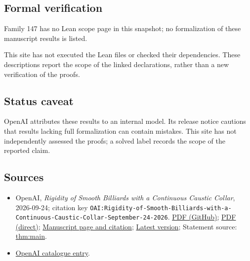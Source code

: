 \documentclass[11pt]{article}
\begin{document}
\subsection{Formal verification}
Family 147 has no Lean scope page in this snapshot; no formalization of these manuscript results is listed.

This site has not executed the Lean files or checked their dependencies. These descriptions report the scope of the linked declarations, rather than a new verification of the proofs.

\subsection{Status caveat}
OpenAI attributes these results to an internal model. Its release notice cautions that results lacking full formalization can contain mistakes. This site has not independently assessed the proofs; a solved label records the scope of the reported claim.

\subsection{Sources}
\begin{itemize}
\item OpenAI, \emph{Rigidity of Smooth Billiards with a Continuous Caustic Collar}, 2026-09-24; citation key \texttt{OAI:Rigidity-of-Smooth-Billiards-with-a-Continuous-Caustic-Collar-September-24-2026}. \href{https://github.com/openai/math/blob/adc7f1241b42e322a6451854ab7e4b4c146bf78a/preprints/Rigidity-of-Smooth-Billiards-with-a-Continuous-Caustic-Collar-September-24-2026/paper.pdf}{PDF (GitHub)}; \href{https://github.com/openai/math/raw/adc7f1241b42e322a6451854ab7e4b4c146bf78a/preprints/Rigidity-of-Smooth-Billiards-with-a-Continuous-Caustic-Collar-September-24-2026/paper.pdf}{PDF (direct)}; \href{https://github.com/openai/math/blob/adc7f1241b42e322a6451854ab7e4b4c146bf78a/preprints/Rigidity-of-Smooth-Billiards-with-a-Continuous-Caustic-Collar-September-24-2026/README.md}{Manuscript page and citation}; \href{https://github.com/openai/math/blob/main/preprints/Rigidity-of-Smooth-Billiards-with-a-Continuous-Caustic-Collar-September-24-2026/paper.pdf}{Latest version}; Statement source: \href{https://github.com/openai/math/blob/adc7f1241b42e322a6451854ab7e4b4c146bf78a/preprints/Rigidity-of-Smooth-Billiards-with-a-Continuous-Caustic-Collar-September-24-2026/build/sections/01-introduction.tex\#L31}{thm:main}.
\item \href{https://github.com/openai/math/blob/adc7f1241b42e322a6451854ab7e4b4c146bf78a/CONTENTS.md}{OpenAI catalogue entry}.
\end{itemize}
\end{document}

